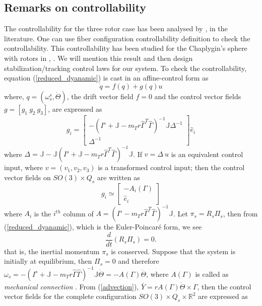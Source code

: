 \documentclass{ifacconf}
\begin{document}
\subsection*{Remarks on controllability}
The controllability for the three rotor case has been analysed by \cite{reg_n_chaotic_2013}, \cite{joshi_banavar} in the literature. One can use fiber configuration controllability definition to check the controllability. This controllability has been studied for the Chaplygin's sphere with rotors in \cite{shen2008}, \cite{karimpur_2012}. We will mention this result and then design stabilization/tracking control laws for our system. To check the controllability, equation (\ref{reduced_dyanamic}) is cast in an affine-control form as
\begin{equation}\nonumber
\dot{q} = f(q) + g(q)u
\end{equation}
where, $q = (\omega_{s}^{s}, \dot{\Theta})$, the drift vector field $f =0$ and the control vector fields $ g = [g_{1}~g_{2}~g_{3}]$, are expressed as 
\begin{equation}
g_{i} = \begin{bmatrix}
- (I^{s} + \mathbb{J} - m_{T}r\widehat{\Gamma}^{T}\widehat{\Gamma})^{-1} \mathbb{J} \Delta^{-1}\\
\Delta^{-1}
\end{bmatrix} \hat{e}_{i}
\end{equation}
where $\Delta = \mathbb{J} - \mathbb{J}(I^{s} + \mathbb{J} - m_{T}r\widehat{\Gamma}^{T}\widehat{\Gamma})^{-1} \mathbb{J}$. If  $v = \Delta~u$ is an equivalent control input, where $v = (v_{1},v_{2},v_{3})$ is a transformed control input; then the control vector fields on $SO(3) \times Q_{s}$ are written as 
\begin{equation}
g_{i} \simeq \begin{bmatrix}
- A_{i}(\Gamma) \\
\hat{e}_{i}
\end{bmatrix}
\end{equation}
where $A_{i}$ is the $i^{th}$ column of $A = (I^{s} - m_{T}r\widehat{\Gamma}^{T}\widehat{\Gamma})^{-1} \mathbb{J}$. Let $\pi_{s} = R_{s} \Pi_{s}$, then from  (\ref{reduced_dyanamic}), which is the Euler-Poincar\'{e} form, we see 
\begin{equation}\label{conserve1}
\frac{d}{dt}\left( R_{s} \Pi_{s} \right)  = 0.
\end{equation}that is, the inertial momentum $\pi_{s}$ is conserved. Suppose that the system is initially at equilibrium, then $\Pi_{s} = 0$ and therefore $\omega_{s} = - (I^{s} + \mathbb{J} - m_{T} r \widehat{\Gamma}\widehat{\Gamma})^{-1}\mathbb{J}\dot{\Theta} = - A(\Gamma) \dot{\Theta}$, where $A(\Gamma)$ is called as \textit{mechanical connection} \cite{schneider}. From (\ref{advection}), $\bar{Y} = r A(\Gamma)\dot{\Theta} \times \Gamma$, then the control vector fields for the complete configuration $SO(3) \times Q_{s} \times \mathbb{R}^{2}$ are expressed as 
\end{document}
